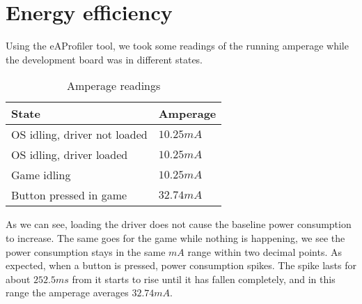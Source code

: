 \section{Energy efficiency}
Using the eAProfiler tool, we took some readings of the running amperage while the development board was in different states.

\begin{table}[h!]
    \centering
    \begin{tabular}{|l|l|}
        \hline
        State                           & Amperage \\ \hline
        OS idling, driver not loaded    & $10.25 mA$ \\ \hline
        OS idling, driver loaded        & $10.25 mA$ \\ \hline
        Game idling                     & $10.25 mA$ \\ \hline
        Button pressed in game          & $32.74 mA$ \\ \hline
    \end{tabular}
    \caption{Amperage readings}
\end{table}

As we can see, loading the driver does not cause the baseline power consumption to increase.
The same goes for the game while nothing is happening, we see the power consumption stays in the same $mA$ range within two decimal points.
As expected, when a button is pressed, power consumption spikes.
The spike lasts for about $252.5ms$ from it starts to rise until it has fallen completely,
and in this range the amperage averages $32.74mA$.
